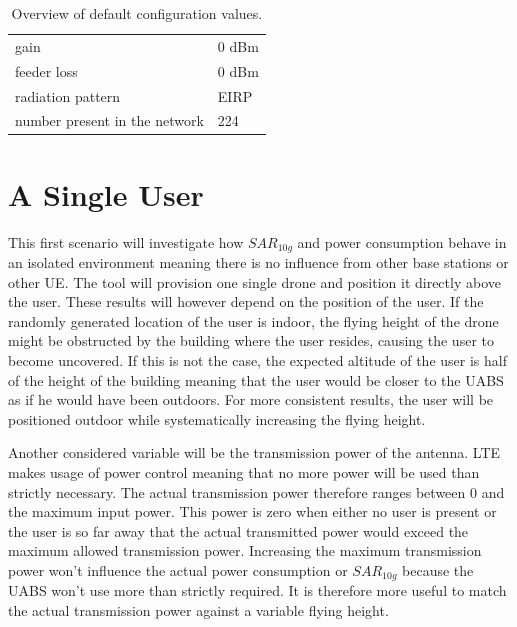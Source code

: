 \begin{table}[!htb]
\begin{tabular}[t]{ll}
        \hspace{3mm} gain                      & 0 dBm   \\ 
        \hspace{3mm} feeder loss               & 0 dBm   \\ 
        \hspace{3mm} radiation pattern         & \acs{EIRP}  \\
        \hspace{3mm} number present in the network         & 224  \\
        \toprule
\end{tabular}
\caption{Overview of default configuration values.}
\label{table:defaultconf}
\end{table}

\section{A Single User}
\label{sec:scenarios_s1}

This first scenario will investigate how $SAR_{10g}$ and power consumption behave in an isolated environment meaning there is no influence 
from other base stations or other \gls{UE}. The tool will provision one single drone and position it directly above the user.
These results will however depend on the position of the user. If the randomly generated location of the user is indoor, 
the flying height of the drone might be obstructed by the building where the user resides, causing the user to become uncovered. If this is not the case,
the expected altitude of the user is half of the height of the building meaning that the user would be closer to the \gls{UABS} as 
if he would have been outdoors. For more consistent results, the user will be positioned outdoor while systematically 
increasing the flying height. 

Another considered variable will be the transmission power of the antenna.
\gls{LTE} makes usage of power control meaning that no more power will be used than strictly necessary. The actual 
transmission power therefore ranges between 0 and the maximum input power. This power is zero when either no user is 
present or the user is so far away that the actual transmitted power would exceed the maximum allowed transmission power.
Increasing the maximum transmission power won't influence the actual power consumption or $SAR_{10g}$ because the \gls{UABS} won't use more
than strictly required. It is therefore more useful to match the actual transmission power against a variable flying height.

